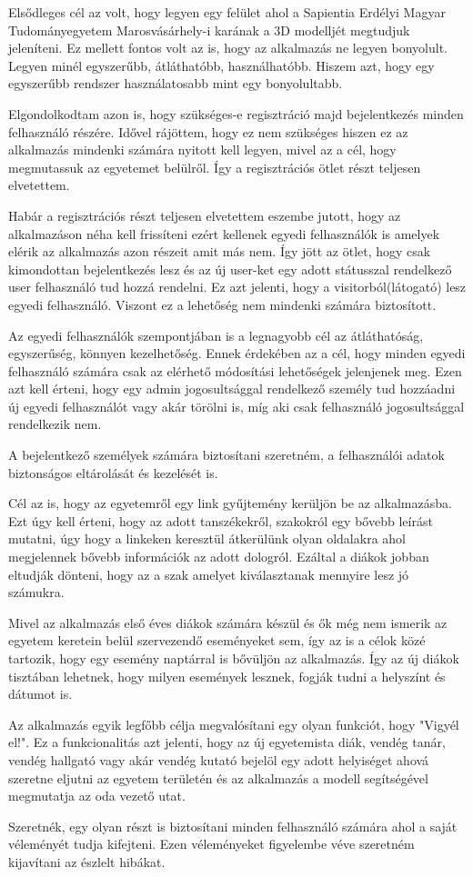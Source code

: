 Elsődleges cél az volt, hogy legyen egy felület ahol a Sapientia Erdélyi Magyar Tudományegyetem Marosvásárhely-i karának a 3D modelljét megtudjuk jeleníteni. Ez mellett fontos volt az is, hogy az alkalmazás ne legyen bonyolult. Legyen minél egyszerűbb, átláthatóbb, használhatóbb. Hiszem azt, hogy egy egyszerűbb rendszer használatosabb mint egy bonyolultabb.

Elgondolkodtam azon is, hogy szükséges-e regisztráció majd bejelentkezés minden felhasználó részére. Idővel rájöttem, hogy ez nem szükséges hiszen ez az alkalmazás mindenki számára nyitott kell legyen, mivel az a cél, hogy megmutassuk az egyetemet belülről. Így a regisztrációs ötlet részt teljesen elvetettem.

Habár a regisztrációs részt teljesen elvetettem eszembe jutott, hogy az alkalmazáson néha kell frissíteni ezért kellenek egyedi felhasználók is amelyek elérik az alkalmazás azon részeit amit más nem. Így jött az ötlet, hogy csak kimondottan bejelentkezés lesz és az új user-ket egy adott státusszal rendelkező user felhasználó tud hozzá rendelni. Ez azt jelenti, hogy a visitorból(látogató) lesz egyedi felhasználó. Viszont ez a lehetőség nem mindenki számára biztosított.

Az egyedi felhasználók szempontjában is a legnagyobb cél az átláthatóság, egyszerűség, könnyen kezelhetőség. Ennek érdekében az a cél, hogy minden egyedi felhasználó számára csak az elérhető módosítási lehetőségek jelenjenek meg. Ezen azt kell érteni, hogy egy admin jogosultsággal rendelkező személy tud hozzáadni új egyedi felhasználót vagy akár törölni is, míg aki csak felhasználó jogosultsággal rendelkezik nem.

A bejelentkező személyek számára biztosítani szeretném, a felhasználói adatok biztonságos eltárolását és kezelését is.

Cél az is, hogy az egyetemről egy link gyűjtemény kerüljön be az alkalmazásba. Ezt úgy kell érteni, hogy az adott tanszékekről, szakokról egy bővebb leírást mutatni, úgy hogy a linkeken keresztül átkerülünk olyan oldalakra ahol megjelennek bővebb információk az adott dologról. Ezáltal a diákok jobban eltudják dönteni, hogy az a szak amelyet kiválasztanak mennyire lesz jó számukra.

Mivel az alkalmazás első éves diákok számára készül és ők még nem ismerik az egyetem keretein belül szervezendő eseményeket sem, így az is a célok közé tartozik, hogy egy esemény naptárral is bővüljön az alkalmazás. Így az új diákok tisztában lehetnek, hogy milyen események lesznek, fogják tudni a helyszínt és dátumot is.

Az alkalmazás egyik legfőbb célja megvalósítani egy olyan funkciót, hogy "Vigyél el!". Ez a funkcionalitás azt jelenti, hogy az új egyetemista diák, vendég tanár, vendég hallgató vagy akár vendég kutató bejelöl egy adott helyiséget ahová szeretne eljutni az egyetem területén és az alkalmazás a modell segítségével megmutatja az oda vezető utat.

Szeretnék, egy olyan részt is biztosítani minden felhasználó számára ahol a saját véleményét tudja kifejteni. Ezen véleményeket figyelembe véve szeretném kijavítani az észlelt hibákat.